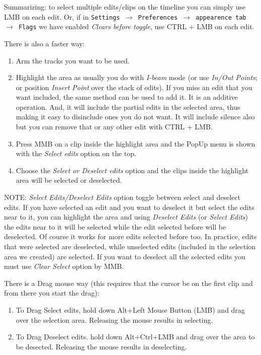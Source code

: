 Summarizing: to select multiple edits/clips on the timeline you can simply use LMB on each edit. Or, if in \texttt{Settings $\rightarrow$ Preferences $\rightarrow$ appearence tab $\rightarrow$ Flags} we have enabled \textit{Clears before toggle}, use CTRL + LMB on each edit.

There is also a faster way:

\begin{enumerate}
	\item Arm the tracks you want to be used.
	\item Highlight the area as usually you do with \textit{I-beam} mode (or use \textit{In/Out Points}; or position \textit{Insert Point} over the stack of edits). If you miss an edit that you want included, the same method can be used to add it. It is an additive operation. And, it will include the partial edits in the selected area, thus making it easy to disinclude ones you do not want.
	It will include silence also but you can remove that or any other edit with CTRL + LMB.
	\item Press MMB on a clip inside the highlight area and the PopUp menu is shown with the \textit{Select edits} option on the top.
	\item Choose the \textit{Select or Deselect edits} option and the clips inside the highlight area will be selected or deselected.
\end{enumerate}

NOTE: \textit{Select Edits/Deselect Edits} option toggle between select and deselect edits. If you have selected an edit and you want to deselect it but select the edits near to it, you can highlight the area and using \textit{Deselect Edits} (or \textit{Select Edits}) the edits near to it will be selected while the edit selected before will be deselected. Of course it works for more edits selected before too. In practice, edits that were selected are deselected, while unselected edits (included in the selection area we created) are selected. If you want to deselect all the selected edits you must use \textit{Clear Select} option by MMB.

There is a Drag mouse way (this requires that the cursor be on the first
clip and from there you start the drag):
\begin{enumerate}
	\item To Drag Select edits, hold down Alt+Left Mouse Button (LMB) and drag over the selection area. Releasing the mouse results in selecting. 
	\item To Drag Deselect edits. hold down Alt+Ctrl+LMB and drag over the area to be desected.  Releasing the mouse results in deselecting.
\end{enumerate}

